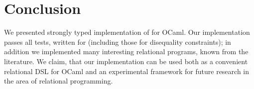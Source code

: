 \section{Conclusion}

We presented strongly typed implementation of \miniKanren for OCaml. Our implementation
passes all tests, written for \miniKanren (including those for disequality constraints);
in addition we implemented many interesting relational programs, known from
the literature. We claim, that our implementation can be used both as a convenient
relational DSL for OCaml and an experimental framework for future research in the area of
relational programming. 

